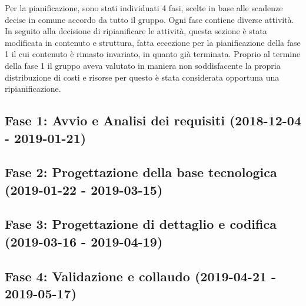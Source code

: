 Per la pianificazione, sono stati individuati 4 fasi, scelte in base alle scadenze decise in comune accordo da tutto il gruppo. Ogni fase contiene diverse attività.\\

\noindent In seguito alla decisione di ripianificare le attività, questa sezione è stata modificata in contenuto e struttura, fatta eccezione per la pianificazione della fase 1 il cui contenuto è rimasto invariato, in quanto già terminata. Proprio al termine della fase 1 il gruppo aveva valutato in maniera non soddisfacente la propria distribuzione di costi e risorse per questo è stata considerata opportuna una ripianificazione.
\subsection{Fase 1: Avvio e Analisi dei requisiti (2018-12-04 - 2019-01-21)}
	

\subsection{Fase 2: Progettazione della base tecnologica (2019-01-22 - 2019-03-15)}	
	
	
\subsection{Fase 3: Progettazione di dettaglio e codifica (2019-03-16 - 2019-04-19)}
	
	
\subsection{Fase 4: Validazione e collaudo (2019-04-21 - 2019-05-17)}
	
	
\newpage